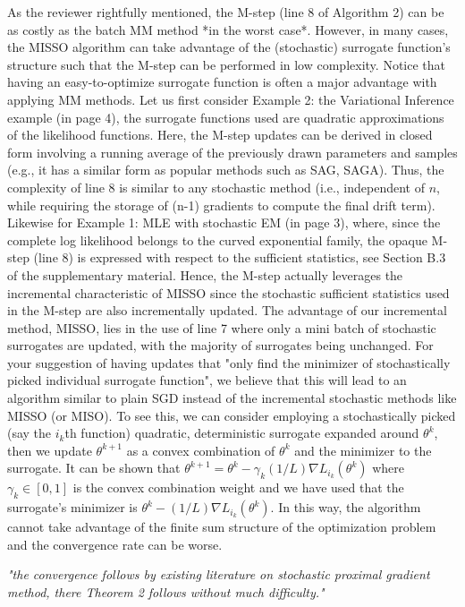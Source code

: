 \documentclass{article} %
\theoremstyle{t}
\begin{document}
As the reviewer rightfully mentioned, the M-step (line 8 of Algorithm 2) can be as costly as the batch MM method *in the worst case*. However, in many cases, the MISSO algorithm can take advantage of the (stochastic) surrogate function's structure such that the M-step can be performed in low complexity. Notice that having an easy-to-optimize surrogate function is often a major advantage with applying MM methods.  
Let us first consider Example 2: the Variational Inference example (in page 4), the surrogate functions used are quadratic approximations of the likelihood functions. Here, the M-step updates can be derived in closed form involving a running average of the previously drawn parameters and samples (e.g., it has a similar form as popular methods such as SAG, SAGA). Thus, the complexity of line 8 is similar to any stochastic method (i.e., independent of $n$, while requiring the storage of (n-1) gradients to compute the final drift term).
Likewise for Example 1: MLE with stochastic EM (in page 3), where, since the complete log likelihood belongs to the curved exponential family, the opaque M-step (line 8) is expressed with respect to the sufficient statistics, see Section B.3 of the supplementary material. Hence, the M-step actually leverages the incremental characteristic of MISSO since the stochastic sufficient statistics used in the M-step are also incrementally updated.
The advantage of our incremental method, MISSO, lies in the use of line 7 where only a mini batch of stochastic surrogates are updated, with the majority of surrogates being unchanged. 
For your suggestion of having updates that "only find the minimizer of stochastically picked individual surrogate function", we believe that this will lead to an algorithm similar to plain SGD instead of the incremental stochastic methods like MISSO (or MISO). To see this, we can consider employing a stochastically picked (say the $i_k$th function) quadratic, deterministic surrogate expanded around $\theta^k$, then we update $\theta^{k+1}$ as a convex combination of $\theta^k$ and the minimizer to the surrogate. It can be shown that
$\theta^{k+1} = \theta^k - \gamma_k (1/L) \nabla L_{i_k}( \theta^k )$
where $\gamma_k \in [0,1]$ is the convex combination weight and we have used that the surrogate's minimizer is $\theta^k - (1/L) \nabla L_{i_k}( \theta^k )$. In this way, the algorithm cannot take advantage of the finite sum structure of the optimization problem and the convergence rate can be worse. 

\textit{"the convergence follows by existing literature on stochastic proximal gradient method, there Theorem 2 follows without much difficulty."}
\end{document}
